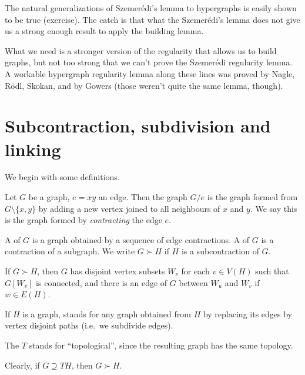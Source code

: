\documentclass[a4paper]{article}
\begin{document}
The natural generalizations of Szemer\'edi's lemma to hypergraphs is easily shown to be true (exercise). The catch is that what the Szemer\'edi's lemma does not give us a strong enough result to apply the building lemma.

What we need is a stronger version of the regularity that allows us to build graphs, but not too strong that we can't prove the Szemer\'edi regularity lemma. A workable hypergraph regularity lemma along these lines was proved by Nagle, R\"odl, Skokan, and by Gowers (those weren't quite the same lemma, though).

\section{Subcontraction, subdivision and linking}
We begin with some definitions.
\begin{defi}
  Let $G$ be a graph, $e = xy$ an edge. Then the graph $G/e$ is the graph formed from $G \setminus \{x, y\}$ by adding a new vertex joined to all neighbours of $x$ and $y$. We say this is the graph formed by \emph{contracting} the edge $e$.
\end{defi}


\begin{defi}
  A  of $G$ is a graph obtained by a sequence of edge contractions. A  of $G$ is a contraction of a subgraph. We write $G \succ H$ if $H$ is a subcontraction of $G$.
\end{defi}
If $G \succ H$, then $G$ has disjoint vertex subsets $W_v$ for each $v \in V(H)$ such that $G[W_v]$ is connected, and there is an edge of $G$ between $W_u$ and $W_v$ if $w \in E(H)$.

\begin{defi}[Subdivision]
  If $H$ is a graph,  stands for any graph obtained from $H$ by replacing its edges by vertex disjoint paths (i.e.\ we subdivide edges).
\end{defi}
The $T$ stands for ``topological'', since the resulting graph has the same topology.

Clearly, if $G \supseteq TH$, then $G \succ H$.

\begin{center}
\end{center}
\end{document}
